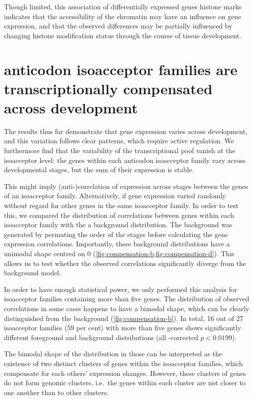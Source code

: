 Though limited, this association of differentially expressed \trna genes histone
marks indicates that the accessibility of the chromatin may have an influence on
\trna gene expression, and that the observed differences may be partially
influenced by changing histone modification status through the course of tissue
development.

\section{\trna anticodon isoacceptor families are transcriptionally compensated
across development}

The results thus far demonstrate that \trna gene expression varies across
development, and this variation follows clear patterns, which require active
regulation. We furthermore find that the variability of the transcriptional
\trna pool vanish at the isoacceptor level: the \trna genes within each
anticodon isoacceptor family vary across developmental stages, but the sum of
their expression is stable.

This might imply (anti-)correlation of expression across stages between the
genes of an isoacceptor family. Alternatively, if \trna gene expression varied
randomly without regard for other \trna genes in the same isoacceptor family. In
order to test this, we compared the distribution of correlations between genes
within each isoacceptor family with the a background distribution. The
background was generated by permuting the order of the stages before calculating
the \trna gene expression correlations. Importantly, these background
distributions have a unimodal shape centred on \num{0}
(\cref{fig:compensation-b,fig:compensation-d}). This allows us to test whether
the observed correlations significantly diverge from the background model.

In order to have enough statistical power, we only performed this analysis for
\trna isoacceptor families containing more than five genes. The distribution
of observed correlations in some cases happens to have a bimodal shape, which
can be clearly distinguished from the background (\cref{fig:compensation-b}). In
total, \num{16} out of \num{27} isoacceptor families (\num{59} per cent) with
more than five genes shows significantly different foreground and background
distributions (all \fdr-corrected \(p < 0.0199\)).

The bimodal shape of the distribution in those can be interpreted as the
existence of two distinct clusters of \trna genes within the isoacceptor
families, which compensate for each others’ expression changes. However, these
clusters of genes do not form genomic clusters, i.e.\ the \trna genes within
each cluster are not closer to one another than to other clusters.

